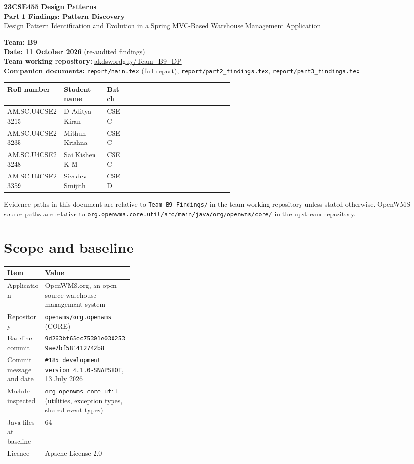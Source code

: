 \documentclass[11pt,a4paper]{article}
\title{}
\author{}
\date{}
\newcommand{\code}[1]{\nolinkurl{#1}}
\begin{document}
\begin{center}
{\Large\textbf{23CSE455 Design Patterns}}\\[4pt]
{\LARGE\textbf{Part 1 Findings: Pattern Discovery}}\\[6pt]
{\large Design Pattern Identification and Evolution in a Spring MVC-Based Warehouse Management Application}
\end{center}

\textbf{Team: B9}\\
\textbf{Date: 11 October 2026} (re-audited findings)\\
\textbf{Team working repository:} \href{https://github.com/akdswordguy/Team_B9_DP}{akdswordguy/Team\_B9\_DP}\\
\textbf{Companion documents:} \code{report/main.tex} (full report), \code{report/part2_findings.tex}, \code{report/part3_findings.tex}


\begin{tabularx}{\linewidth}{@{}P{0.25\linewidth}P{0.19\linewidth}P{0.10\linewidth}X@{}}
\toprule
Roll number & Student name & Batch \\
\midrule
AM.SC.U4CSE23215 & D Aditya Kiran & CSE C \\
AM.SC.U4CSE23235 & Mithun Krishna & CSE C \\
AM.SC.U4CSE23248 & Sai Kishen K M & CSE C\\
AM.SC.U4CSE23359 & Sivadev Smijith & CSE D \\
\bottomrule
\end{tabularx}

Evidence paths in this document are relative to \code{Team_B9_Findings/} in the team working repository unless stated otherwise. OpenWMS source paths are relative to \code{org.openwms.core.util/src/main/java/org/openwms/core/} in the upstream repository.

\section{Scope and baseline}

\begin{tabularx}{\linewidth}{@{}P{0.30\linewidth}Y@{}}
\toprule
Item & Value\\
\midrule
Application & OpenWMS.org, an open-source warehouse management system\\
Repository & \href{https://github.com/openwms/org.openwms}{\nolinkurl{openwms/org.openwms}} (CORE)\\
Baseline commit & \code{9d263bf65ec75301e0302539ae7bf581412742b8}\\
Commit message and date & \texttt{\#185 development version 4.1.0-SNAPSHOT}, 13 July 2026\\
Module inspected & \code{org.openwms.core.util} (utilities, exception types, shared event types)\\
Java files at baseline & 64\\
Licence & Apache License 2.0\\
\bottomrule
\end{tabularx}
\end{document}
